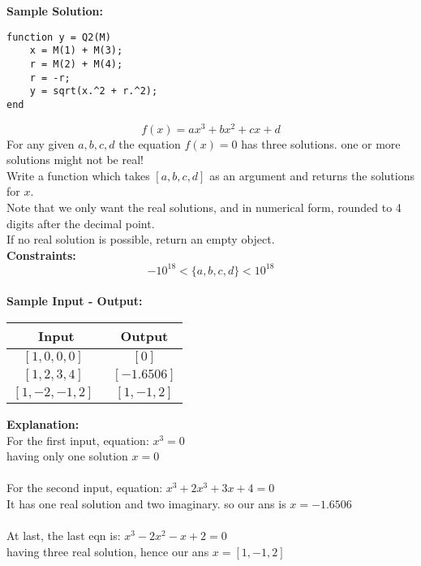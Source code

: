 \documentclass[11pt,paper=a4,answers]{exam}
\begin{document}
\begin{questions}
\textbf{Sample Solution:}\\

\lstset{language=Octave, frame=shadowbox}
\begin{lstlisting}
function y = Q2(M)
    x = M(1) + M(3);
    r = M(2) + M(4);
    r = -r;
    y = sqrt(x.^2 + r.^2);
end
\end{lstlisting}

\droppoints
\newpage
\question[10]
\label{Q:zbus}
$$f(x) = ax^3 + bx^2 + cx + d$$
For any given $a, b, c, d$ the equation $f(x) = 0$ has three solutions. one or more solutions might not be real!\\
Write a function which takes $[a, b, c, d]$ as an argument and returns the solutions for $x$.\\
Note that we only want the real solutions, and in numerical form, rounded to 4 digits after the decimal point.
\\If no real solution is possible, return an empty object.\\

\textbf{ Constraints:} 
$$ -10^{18} < \{ a, b, c, d \} < 10^{18}$$ \\

\textbf{ Sample Input - Output:}\\
\begin{center}
\begin{tabular}{|c|c|}
\hline
\textbf{Input} & \textbf{Output}\\
\hline
$[1, 0, 0, 0]\ \ $ & $[0]$ \\
$[1, 2, 3, 4]\ \ $ & $[-1.6506]$ \\
$[1, -2, -1, 2] \ \ $ & $[1, -1, 2]$ \\
\hline
\end{tabular}
\end{center}

\textbf{Explanation:} \\
For the first input, equation: $ x^3 = 0$ \\
having only one solution $x = 0$ \\
\\
For the second input, equation: $x^3 + 2x^3 + 3x + 4 = 0$\\
It has one real solution and two imaginary. so our ans is $x = -1.6506$\\
\\
At last, the last eqn is: $x^3 - 2x^2 - x + 2 = 0$\\
having three real solution, hence our ans $x = [1, -1, 2]$ 
\\



\end{questions}
\end{document}
